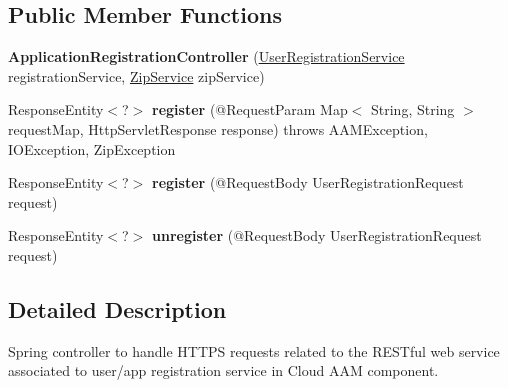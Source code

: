 \subsection*{Public Member Functions}
\begin{DoxyCompactItemize}
\item 
{\bfseries Application\+Registration\+Controller} (\hyperlink{classeu_1_1h2020_1_1symbiote_1_1security_1_1services_1_1UserRegistrationService}{User\+Registration\+Service} registration\+Service, \hyperlink{classeu_1_1h2020_1_1symbiote_1_1security_1_1services_1_1ZipService}{Zip\+Service} zip\+Service)\hypertarget{classeu_1_1h2020_1_1symbiote_1_1security_1_1rest_1_1ApplicationRegistrationController_a499ce6f5c03029ba9748ce8d3724c189}{}\label{classeu_1_1h2020_1_1symbiote_1_1security_1_1rest_1_1ApplicationRegistrationController_a499ce6f5c03029ba9748ce8d3724c189}

\item 
Response\+Entity$<$?$>$ {\bfseries register} (@Request\+Param Map$<$ String, String $>$ request\+Map, Http\+Servlet\+Response response)  throws A\+A\+M\+Exception, I\+O\+Exception, Zip\+Exception \hypertarget{classeu_1_1h2020_1_1symbiote_1_1security_1_1rest_1_1ApplicationRegistrationController_abf530fcf7f2895473187a79480acd949}{}\label{classeu_1_1h2020_1_1symbiote_1_1security_1_1rest_1_1ApplicationRegistrationController_abf530fcf7f2895473187a79480acd949}

\item 
Response\+Entity$<$?$>$ {\bfseries register} (@Request\+Body User\+Registration\+Request request)\hypertarget{classeu_1_1h2020_1_1symbiote_1_1security_1_1rest_1_1ApplicationRegistrationController_a5a1352f84bd849039cdde117e929ddda}{}\label{classeu_1_1h2020_1_1symbiote_1_1security_1_1rest_1_1ApplicationRegistrationController_a5a1352f84bd849039cdde117e929ddda}

\item 
Response\+Entity$<$?$>$ {\bfseries unregister} (@Request\+Body User\+Registration\+Request request)\hypertarget{classeu_1_1h2020_1_1symbiote_1_1security_1_1rest_1_1ApplicationRegistrationController_aa410f10874546858272e474b5baf5076}{}\label{classeu_1_1h2020_1_1symbiote_1_1security_1_1rest_1_1ApplicationRegistrationController_aa410f10874546858272e474b5baf5076}

\end{DoxyCompactItemize}


\subsection{Detailed Description}
Spring controller to handle H\+T\+T\+PS requests related to the R\+E\+S\+Tful web service associated to user/app registration service in Cloud A\+AM component.

